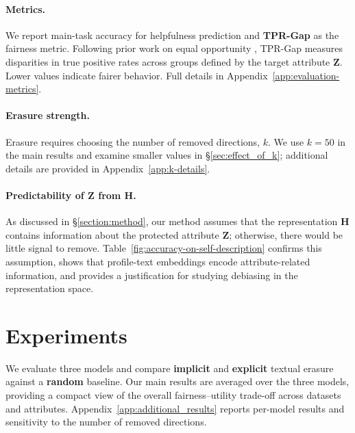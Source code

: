\documentclass[11pt]{article}
\newcommand{\rv}[1]{\mathbf{#1}}
\begin{document}
\paragraph{Metrics.}
We report main-task accuracy for helpfulness prediction and \textbf{TPR-Gap} as the fairness metric. Following prior work on equal opportunity \citep{DeArteaga-2019-biasbios}, TPR-Gap measures disparities in true positive rates across groups defined by the target attribute $\rv{Z}$. Lower values indicate fairer behavior. 
Full details in Appendix~\ref{app:evaluation-metrics}.







\paragraph{Erasure strength.}
Erasure requires choosing the number of removed directions, $k$. We use $k=50$ in the main results and examine smaller values in \S\ref{sec:effect_of_k}; additional details are provided in Appendix~\ref{app:k-details}.


\paragraph{Predictability of $\rv{Z}$ from $\rv{H}$.}
As discussed in \S\ref{section:method}, our method assumes that the representation $\rv{H}$ contains information about the protected attribute $\rv{Z}$; otherwise, there would be little signal to remove. Table~\ref{fig:accuracy-on-self-description} confirms this assumption, shows that profile-text embeddings encode attribute-related information, and provides a justification for studying debiasing in the representation space.










\section{Experiments}







We evaluate three models and compare \textbf{implicit} and \textbf{explicit} textual erasure against a \textbf{random} baseline. Our main results are averaged over the three models, providing a compact view of the overall fairness--utility trade-off across datasets and attributes. Appendix~\ref{app:additional_results} reports per-model results and sensitivity to the number of removed directions.
\end{document}
